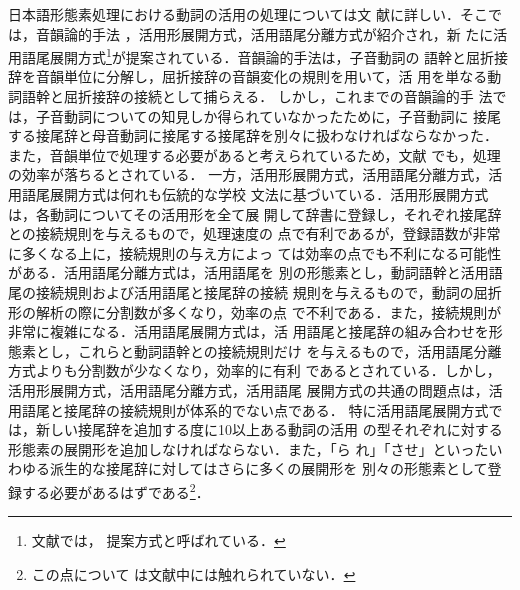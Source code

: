 日本語形態素処理における動詞の活用の処理については文
献\cite{hisamitu94b,hisamitu94c}に詳しい．そこでは，音韻論的手法
\cite{bloch,teramura}，活用形展開方式，活用語尾分離方式が紹介され，新
たに活用語尾展開方式\footnote{文献\cite{hisamitu94b,hisamitu94c}では，
提案方式と呼ばれている．}が提案されている．音韻論的手法は，子音動詞の
語幹と屈折接辞を音韻単位に分解し，屈折接辞の音韻変化の規則を用いて，活
用を単なる動詞語幹と屈折接辞の接続として捕らえる．
しかし，これまでの音韻論的手
法では，子音動詞についての知見しか得られていなかったために，子音動詞に
接尾する接尾辞と母音動詞に接尾する接尾辞を別々に扱わなければならなかった．
また，音韻単位で処理する必要があると考えられているため，文献
\cite{hisamitu94b,hisamitu94c}でも，処理の効率が落ちるとされている．
一方，活用形展開方式，活用語尾分離方式，活用語尾展開方式は何れも伝統的な学校
文法に基づいている．活用形展開方式は，各動詞についてその活用形を全て展
開して辞書に登録し，それぞれ接尾辞との接続規則を与えるもので，処理速度の
点で有利であるが，登録語数が非常に多くなる上に，接続規則の与え方によっ
ては効率の点でも不利になる可能性がある．活用語尾分離方式は，活用語尾を
別の形態素とし，動詞語幹と活用語尾の接続規則および活用語尾と接尾辞の接続
規則を与えるもので，動詞の屈折形の解析の際に分割数が多くなり，効率の点
で不利である．また，接続規則が非常に複雑になる．活用語尾展開方式は，活
用語尾と接尾辞の組み合わせを形態素とし，これらと動詞語幹との接続規則だけ
を与えるもので，活用語尾分離方式よりも分割数が少なくなり，効率的に有利
であるとされている．しかし，活用形展開方式，活用語尾分離方式，活用語尾
展開方式の共通の問題点は，活用語尾と接尾辞の接続規則が体系的でない点である．
特に活用語尾展開方式では，新しい接尾辞を追加する度に10以上ある動詞の活用
の型それぞれに対する形態素の展開形を追加しなければならない．また，「ら
れ」「させ」といったいわゆる派生的な接尾辞に対してはさらに多くの展開形を
別々の形態素として登録する必要があるはずである\footnote{この点について
は文献中には触れられていない．}．

